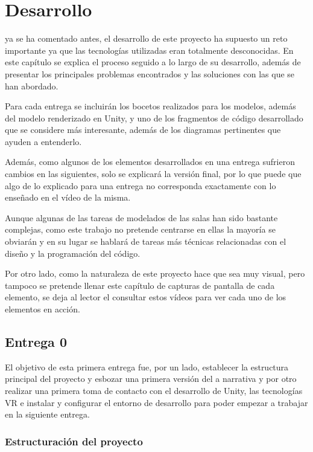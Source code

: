\chapter{Desarrollo}
\label{chap:desarrollo}

 ya se ha comentado antes, el desarrollo de este proyecto ha supuesto un reto importante ya que las tecnologías utilizadas eran totalmente desconocidas. En este capítulo se explica el proceso seguido a lo largo de su desarrollo, además de presentar los principales problemas encontrados y las soluciones con las que se han abordado.

Para cada entrega se incluirán los bocetos realizados para los modelos, además del modelo renderizado en Unity, y uno de los fragmentos de código desarrollado que se considere más interesante, además de los diagramas pertinentes que ayuden a entenderlo.

Además, como algunos de los elementos desarrollados en una entrega sufrieron cambios en las siguientes, solo se explicará la versión final, por lo que puede que algo de lo explicado para una entrega no corresponda exactamente con lo enseñado en el vídeo de la misma.

Aunque algunas de las tareas de modelados de las salas han sido bastante complejas, como este trabajo no pretende centrarse en ellas la mayoría se obviarán y en su lugar se hablará de tareas más técnicas relacionadas con el diseño y la programación del código.

Por otro lado, como la naturaleza de este proyecto hace que sea muy visual, pero tampoco se pretende llenar este capítulo de capturas de pantalla de cada elemento, se deja al lector el consultar estos vídeos para ver cada uno de los elementos en acción.

\section{Entrega 0}

El objetivo de esta primera entrega fue, por un lado, establecer la estructura principal del proyecto y esbozar una primera versión del a narrativa y por otro realizar una primera toma de contacto con el desarrollo de Unity, las tecnologías \acs{VR} e instalar y configurar el entorno de desarrollo para poder empezar a trabajar en la siguiente entrega.

\subsection{Estructuración del proyecto}

